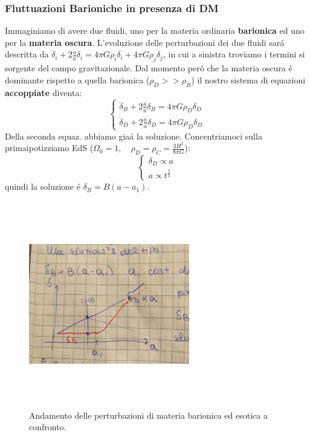 \documentclass[12pt, a4paper]{article}
\begin{document}
\subsubsection{Fluttuazioni Barioniche in presenza di DM}
Immaginiamo di avere due fluidi, uno per la materia ordinaria \textbf{barionica} ed uno per la \textbf{materia oscura}. L'evoluzione delle perturbazioni dei due fluidi sar\'{a} descritta da $\ddot{\delta}_i+2\frac{\dot{a}}{a}\dot{\delta}_i=4\pi G \rho_i \delta_i+4\pi G \rho_j\delta_j$, in cui a sinistra troviamo i termini si sorgente del campo gravitazionale. Dal momento per\'{o} che la materia oscura \'{e} dominante rispetto a quella barionica ($\rho_D>>\rho_B$) il nostro sistema di equazioni \textbf{accoppiate} diventa:
\begin{equation}
\begin{cases}
\ddot{\delta}_B+2\frac{\dot{a}}{a}\dot{\delta}_B=4\pi G \rho_D\delta_D
\\
\ddot{\delta}_D+2\frac{\dot{a}}{a}\dot{\delta}_D=4\pi G \rho_D\delta_D
\end{cases}
\end{equation}
Della seconda equaz. abbiamo gia\'{a} la soluzione. Concentriamoci sulla primaipotizziamo EdS ($\Omega_0=1, \quad \rho_D=\rho_C=\frac{3H^2}{8\pi G}$):
\begin{equation}
\begin{cases}
\delta_D\propto a
\\
a\propto t^{\frac{2}{3}}
\end{cases}
\end{equation}
quindi la soluzione \'{e} $\delta_B= B(a-a_1)$. 
\begin{figure}[htp]
\centering
\includegraphics[width=7cm, height=9cm]{images/pertosc.jpeg}
\caption{Andamento delle perturbazioni di materia barionica ed esotica a confronto.}
\label{fig:pertosc}
\end{figure}
\end{document}
